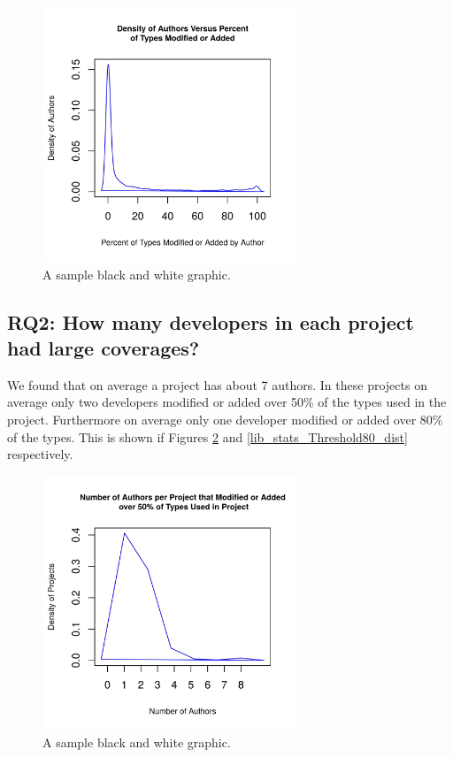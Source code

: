 \documentclass{sig-alternate-05-2015}
\begin{document}
\begin{figure}[ht]
\centering
\includegraphics[height=3in, width=3in]{../lib_stats_dist}
\caption{A sample black and white graphic.}
\label{lib_stats_dist}
\end{figure}

\subsection{RQ2: How many developers in each project had large coverages?}
We found that on average a project has about 7 authors. In these projects on average only two developers modified or added over 50\% of the types used in the project. Furthermore on average only one developer modified or added over 80\% of the types. This is shown if Figures \ref{lib_stats_Threshold50_dist} and \ref{lib_stats_Threshold80_dist} respectively.

\begin{figure}[ht]
\centering
\includegraphics[height=3in, width=3in]{../lib_stats_Threshold50_dist}
\caption{A sample black and white graphic.}
\label{lib_stats_Threshold50_dist}
\end{figure}
\end{document}
